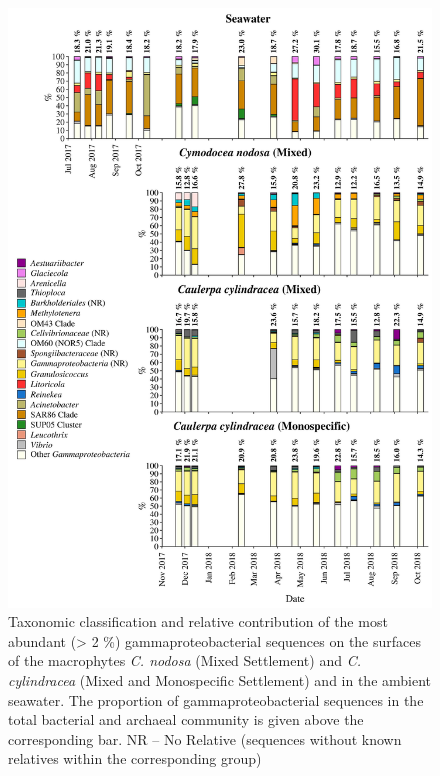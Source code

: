 \documentclass[12pt,]{article}
\begin{document}
\begin{figure}[H]

{\centering \includegraphics[width=0.85\linewidth]{../results/figures/gammaproteobacteria_bar_plot} 

}

\caption{Taxonomic classification and relative contribution of the most abundant (> 2 \si{\percent}) gammaproteobacterial sequences on the surfaces of the macrophytes \textit{C. nodosa} (Mixed Settlement) and \textit{C. cylindracea} (Mixed and Monospecific Settlement) and in the ambient seawater. The proportion of gammaproteobacterial sequences in the total bacterial and archaeal community is given above the corresponding bar. NR -- No Relative (sequences without known relatives within the corresponding group)\label{gamma}}\label{fig:unnamed-chunk-8}
\end{figure}
\end{document}
